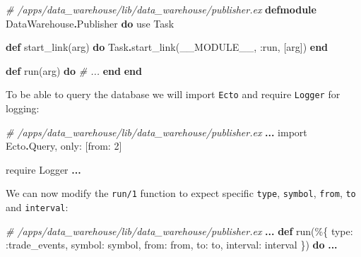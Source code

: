 \documentclass[
  oneside]{book}
\newenvironment{Shaded}{\begin{snugshade}}{\end{snugshade}}
\newcommand{\CommentTok}[1]{\textcolor[rgb]{0.56,0.35,0.01}{\textit{#1}}}
\newcommand{\ConstantTok}[1]{\textcolor[rgb]{0.00,0.00,0.00}{#1}}
\newcommand{\DecValTok}[1]{\textcolor[rgb]{0.00,0.00,0.81}{#1}}
\newcommand{\ImportTok}[1]{#1}
\newcommand{\KeywordTok}[1]{\textcolor[rgb]{0.13,0.29,0.53}{\textbf{#1}}}
\newcommand{\NormalTok}[1]{#1}
\newcommand{\OperatorTok}[1]{\textcolor[rgb]{0.81,0.36,0.00}{\textbf{#1}}}
\newcommand{\VariableTok}[1]{\textcolor[rgb]{0.00,0.00,0.00}{#1}}
\begin{document}
\begin{Shaded}
\begin{Highlighting}[]
\CommentTok{\# /apps/data\_warehouse/lib/data\_warehouse/publisher.ex}
\KeywordTok{defmodule} \ConstantTok{DataWarehouse}\OperatorTok{.}\ConstantTok{Publisher} \KeywordTok{do}
  \ImportTok{use} \ConstantTok{Task}

  \KeywordTok{def}\NormalTok{ start\_link(arg) }\KeywordTok{do}
    \ConstantTok{Task}\OperatorTok{.}\NormalTok{start\_link(}\ConstantTok{\_\_MODULE\_\_}\NormalTok{, }\VariableTok{:run}\NormalTok{, [arg])}
  \KeywordTok{end}

  \KeywordTok{def}\NormalTok{ run(arg) }\KeywordTok{do}
    \CommentTok{\# ...}
  \KeywordTok{end}
\KeywordTok{end}
\end{Highlighting}
\end{Shaded}

To be able to query the database we will import \texttt{Ecto} and require \texttt{Logger} for logging:

\begin{Shaded}
\begin{Highlighting}[]
  \CommentTok{\# /apps/data\_warehouse/lib/data\_warehouse/publisher.ex}
  \OperatorTok{...}
  \ImportTok{import} \ConstantTok{Ecto}\OperatorTok{.}\ConstantTok{Query}\NormalTok{, }\VariableTok{only:}\NormalTok{ [}\VariableTok{from:} \DecValTok{2}\NormalTok{]}

  \ImportTok{require} \ConstantTok{Logger}
  \OperatorTok{...}
\end{Highlighting}
\end{Shaded}

We can now modify the \texttt{run/1} function to expect specific \texttt{type}, \texttt{symbol}, \texttt{from}, \texttt{to} and \texttt{interval}:

\begin{Shaded}
\begin{Highlighting}[]
  \CommentTok{\# /apps/data\_warehouse/lib/data\_warehouse/publisher.ex  }
  \OperatorTok{...}
  \KeywordTok{def}\NormalTok{ run(\%\{}
        \VariableTok{type:} \VariableTok{:trade\_events}\NormalTok{,}
        \VariableTok{symbol:}\NormalTok{ symbol,}
        \VariableTok{from:}\NormalTok{ from,}
        \VariableTok{to:}\NormalTok{ to,}
        \VariableTok{interval:}\NormalTok{ interval}
\NormalTok{      \}) }\KeywordTok{do}
    \OperatorTok{...}  
\end{Highlighting}
\end{Shaded}
\end{document}
